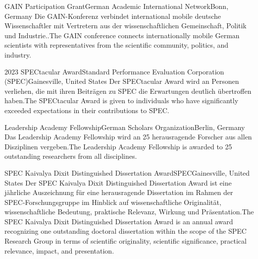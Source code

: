 
\begin{cventries}

    {GAIN Participation Grant}{German Academic International Network}{Bonn, Germany}%
    {}%
    {Die GAIN-Konferenz verbindet international mobile deutsche Wissenschaftler mit Vertretern aus der wissenschaftlichen Gemeinschaft, Politik und Industrie..}{The GAIN conference connects internationally mobile German scientists with representatives from the scientific community, politics, and industry.}

    {2023 SPECtacular Award}{Standard Performance Evaluation Corporation (SPEC)}{Gainesville, United States}%
    {}%
    {Der SPECtacular Award wird an Personen verliehen, die mit ihren Beiträgen zu SPEC die Erwartungen deutlich übertroffen haben.}{The SPECtacular Award is given to individuals who have significantly exceeded expectations in their contributions to SPEC.}

	{Leadership Academy Fellowship}{German Scholars Organization}{Berlin, Germany}%
    {}%
    {Das Leadership Academy Fellowship wird an 25 herausragende Forscher aus allen Disziplinen vergeben.}{The Leadership Academy Fellowship is awarded to 25 outstanding researchers from all disciplines.}

	{SPEC Kaivalya Dixit Distinguished Dissertation Award}{SPEC}{Gainesville, United States}%
    {}%
    {Der SPEC Kaivalya Dixit Distinguished Dissertation Award ist eine jährliche Auszeichnung für eine herausragende Dissertation im Rahmen der SPEC-Forschungsgruppe im Hinblick auf wissenschaftliche Originalität, wissenschaftliche Bedeutung, praktische Relevanz, Wirkung und Präsentation.}{The SPEC Kaivalya Dixit Distinguished Dissertation Award is an annual award recognizing one outstanding doctoral dissertation within the scope of the SPEC Research Group in terms of scientific originality, scientific significance, practical relevance, impact, and presentation.}


\end{cventries}
